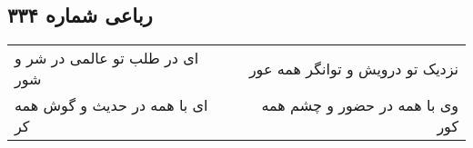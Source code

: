 \begin{center}
\section*{رباعی شماره ۳۳۴}
\label{sec:sh334}
\begin{longtable}{l p{0.5cm} r}
ای در طلب تو عالمی در شر و شور
&&
نزدیک تو درویش و توانگر همه عور
\\
ای با همه در حدیث و گوش همه کر
&&
وی با همه در حضور و چشم همه کور
\\
\end{longtable}
\end{center}
